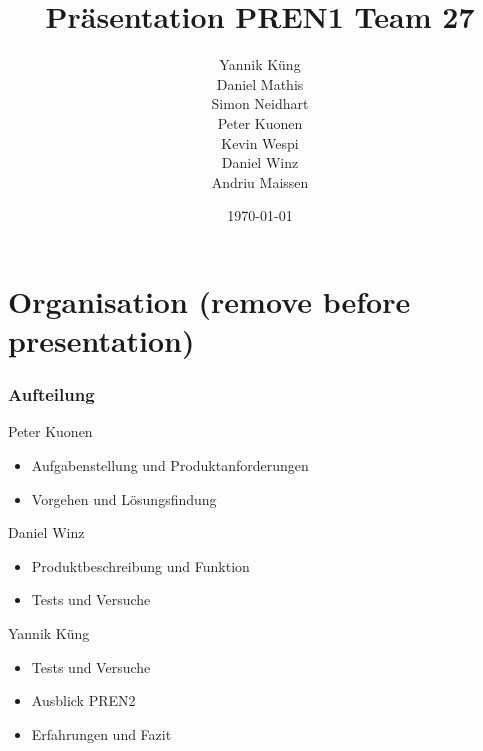 \documentclass[xcolor=dvipsnames]{beamer}
\title[Präsentation PREN1]{Präsentation PREN1 Team 27}
\author[
    Team 27]
{
    Yannik Küng \\
    Daniel Mathis \\
    Simon Neidhart \\
    Peter Kuonen \\
    Kevin Wespi \\
    Daniel Winz \\
    Andriu Maissen
}
\institute{HSLU T\&A}
\date{\today}
\begin{document}
\begin{frame}
    \titlepage
\end{frame}

\begin{frame}
    \tableofcontents
\end{frame}

\section{Organisation (remove before presentation)}
\begin{frame}
    \frametitle{Aufteilung}
    \begin{block}{Peter Kuonen}
        \begin{itemize}
            \item Aufgabenstellung und Produktanforderungen
            \item Vorgehen und Lösungsfindung
        \end{itemize}
    \end{block}
    \begin{block}{Daniel Winz}
        \begin{itemize}
            \item Produktbeschreibung und Funktion
            \item Tests und Versuche
        \end{itemize}
    \end{block}
    \begin{block}{Yannik Küng}
        \begin{itemize}
            \item Tests und Versuche
            \item Ausblick PREN2
            \item Erfahrungen und Fazit
        \end{itemize}
    \end{block}
\end{frame}
\end{document}
